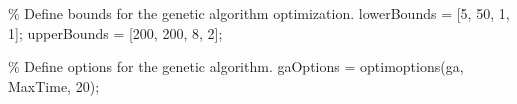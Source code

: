 \documentclass[
]{agujournal2019}
\newenvironment{Shaded}{\begin{snugshade}}{\end{snugshade}}
\newcommand{\CommentTok}[1]{\textcolor[rgb]{0.37,0.37,0.37}{#1}}
\newcommand{\FloatTok}[1]{\textcolor[rgb]{0.68,0.00,0.00}{#1}}
\newcommand{\NormalTok}[1]{\textcolor[rgb]{0.00,0.23,0.31}{#1}}
\newcommand{\OperatorTok}[1]{\textcolor[rgb]{0.37,0.37,0.37}{#1}}
\newcommand{\SpecialStringTok}[1]{\textcolor[rgb]{0.13,0.47,0.30}{#1}}
\newcommand{\VariableTok}[1]{\textcolor[rgb]{0.07,0.07,0.07}{#1}}
\begin{document}
\begin{Shaded}
\begin{Highlighting}[]
    \CommentTok{\% Define bounds for the genetic algorithm optimization.}
    \VariableTok{lowerBounds} \OperatorTok{=}\NormalTok{ [}\FloatTok{5}\OperatorTok{,} \FloatTok{50}\OperatorTok{,} \FloatTok{1}\OperatorTok{,} \FloatTok{1}\NormalTok{]}\OperatorTok{;}
    \VariableTok{upperBounds} \OperatorTok{=}\NormalTok{ [}\FloatTok{200}\OperatorTok{,} \FloatTok{200}\OperatorTok{,} \FloatTok{8}\OperatorTok{,} \FloatTok{2}\NormalTok{]}\OperatorTok{;}

    \CommentTok{\% Define options for the genetic algorithm.}
    \VariableTok{gaOptions} \OperatorTok{=} \VariableTok{optimoptions}\NormalTok{(}\SpecialStringTok{\textquotesingle{}ga\textquotesingle{}}\OperatorTok{,} \SpecialStringTok{\textquotesingle{}MaxTime\textquotesingle{}}\OperatorTok{,} \FloatTok{20}\NormalTok{)}\OperatorTok{;}
\end{Highlighting}
\end{Shaded}
\end{document}
